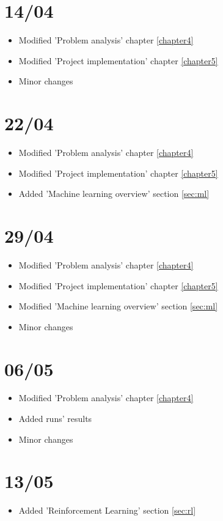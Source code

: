 \section{14/04}
\begin{itemize}
    \item Modified 'Problem analysis' chapter \ref{chapter4}
    \item Modified 'Project implementation' chapter \ref{chapter5}
    \item Minor changes
\end{itemize}

\section{22/04}
\begin{itemize}
    \item Modified 'Problem analysis' chapter \ref{chapter4}
    \item Modified 'Project implementation' chapter \ref{chapter5}
    \item Added 'Machine learning overview' section \ref{sec:ml}
\end{itemize}

\section{29/04}
\begin{itemize}
    \item Modified 'Problem analysis' chapter \ref{chapter4}
    \item Modified 'Project implementation' chapter \ref{chapter5}
    \item Modified 'Machine learning overview' section \ref{sec:ml}
    \item Minor changes
\end{itemize}

\section{06/05}
\begin{itemize}
    \item Modified 'Problem analysis' chapter \ref{chapter4}
    \item Added runs' results
    \item Minor changes
\end{itemize}

\section{13/05}
\begin{itemize}
    \item Added 'Reinforcement Learning' section \ref{sec:rl}
\end{itemize}